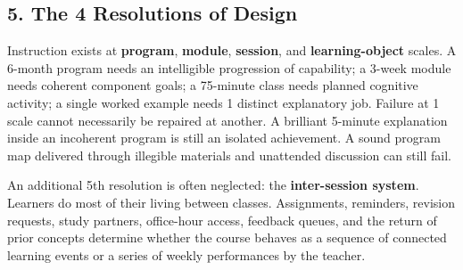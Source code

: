 \subsection*{5. The 4 Resolutions of Design}

Instruction exists at \textbf{program}, \textbf{module}, \textbf{session}, and \textbf{learning-object} scales. A 6-month program needs an intelligible progression of capability; a 3-week module needs coherent component goals; a 75-minute class needs planned cognitive activity; a single worked example needs 1 distinct explanatory job. Failure at 1 scale cannot necessarily be repaired at another. A brilliant 5-minute explanation inside an incoherent program is still an isolated achievement. A sound program map delivered through illegible materials and unattended discussion can still fail.

An additional 5th resolution is often neglected: the \textbf{inter-session system}. Learners do most of their living between classes. Assignments, reminders, revision requests, study partners, office-hour access, feedback queues, and the return of prior concepts determine whether the course behaves as a sequence of connected learning events or a series of weekly performances by the teacher.
